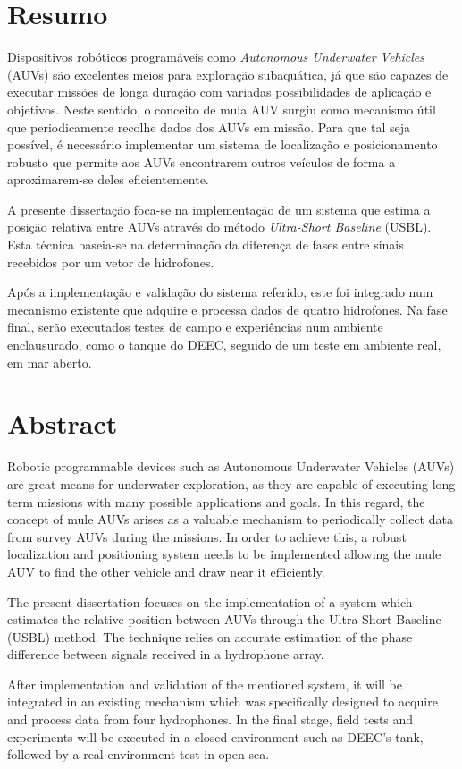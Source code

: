 \chapter*{Resumo}

Dispositivos robóticos programáveis como \textit{Autonomous Underwater Vehicles} (AUVs) são excelentes meios para exploração subaquática, já que são capazes de executar missões de longa duração com variadas possibilidades de aplicação e objetivos. Neste sentido, o conceito de mula AUV surgiu como mecanismo útil que periodicamente recolhe dados dos AUVs em missão. Para que tal seja possível, é necessário implementar um sistema de localização e posicionamento robusto que permite aos AUVs encontrarem outros veículos de forma a aproximarem-se deles eficientemente.

A presente dissertação foca-se na implementação de um sistema que estima a posição relativa entre AUVs através do método \textit{Ultra-Short Baseline} (USBL). Esta técnica baseia-se na determinação da diferença de fases entre sinais recebidos por um vetor de hidrofones.

Após a implementação e validação do sistema referido, este foi integrado num mecanismo existente que adquire e processa dados de quatro hidrofones. Na fase final, serão executados testes de campo e experiências num ambiente enclausurado, como o tanque do DEEC, seguido de um teste em ambiente real, em mar aberto.


\chapter*{Abstract}

Robotic programmable devices such as Autonomous Underwater Vehicles (AUVs) are great means for underwater exploration, as they are capable of executing long term missions with many possible applications and goals. In this regard, the concept of mule AUVs arises as a valuable mechanism to periodically collect data from survey AUVs during the missions. In order to achieve this, a robust localization and positioning system needs to be implemented allowing the mule AUV to find the other vehicle and draw near it efficiently.

The present dissertation focuses on the implementation of a system which estimates the relative position between AUVs through the Ultra-Short Baseline (USBL) method. The technique relies on accurate estimation of the phase difference between signals received in a hydrophone array. 

After implementation and validation of the mentioned system, it will be integrated in an existing mechanism which was specifically designed to acquire and process data from four hydrophones. In the final stage, field tests and experiments will be executed in a closed environment such as DEEC's tank, followed by a real environment test in open sea.